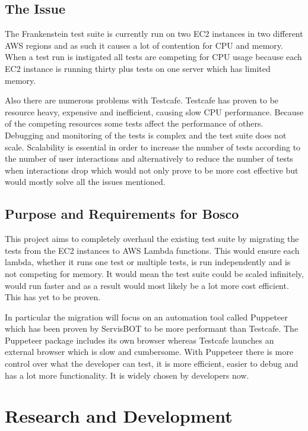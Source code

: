\documentclass[12pt,a4paper,titlepage]{report}
\begin{document}
\section{The Issue}

The Frankenstein test suite is currently run on two EC2 instances in two different AWS regions and as such it causes a lot of contention for CPU and memory. When a test run is instigated all tests are competing for CPU usage because each EC2 instance is running thirty plus tests on one server which has limited memory.

Also there are numerous problems with Testcafe. Testcafe has proven to be resource heavy, expensive and inefficient, causing slow CPU performance. Because of the competing resources some tests affect the performance of others. Debugging and monitoring of the tests is complex and the test suite does not scale. Scalability is essential in order to increase the number of tests according to the number of user interactions and alternatively to reduce the number of tests when interactions drop which would not only prove to be more cost effective but would mostly solve all the issues mentioned.

\section{Purpose and Requirements for Bosco}

This project aims to completely overhaul the existing test suite by migrating the tests from the EC2 instances to AWS Lambda functions. This would ensure each lambda, whether it runs one test or multiple tests, is run independently and is not competing for memory. It would mean the test suite could be scaled infinitely, would run faster and as a result would most likely be a lot more cost efficient. This has yet to be proven.

In particular the migration will focus on an automation tool called Puppeteer which has been proven by ServisBOT to be more performant than Testcafe. The Puppeteer package includes its own browser whereas Testcafe launches an external browser which is slow and cumbersome. With Puppeteer there is more control over what the developer can test, it is more efficient, easier to debug and has a lot more functionality. It is widely chosen by developers now.

\chapter{Research and Development}
\end{document}
